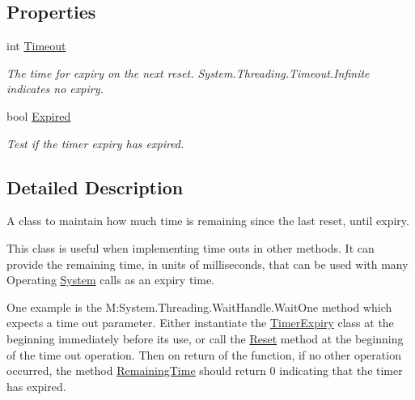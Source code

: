 \subsection*{Properties}
\begin{DoxyCompactItemize}
\item 
int \mbox{\hyperlink{class_r_j_c_p_1_1_datastructures_1_1_timer_expiry_ad6a62756590878b3053a15a5c112d944}{Timeout}}
\begin{DoxyCompactList}\small\item\em The time for expiry on the next reset. System.\+Threading.\+Timeout.\+Infinite indicates no expiry. \end{DoxyCompactList}\item 
bool \mbox{\hyperlink{class_r_j_c_p_1_1_datastructures_1_1_timer_expiry_ab764bd1af3d3270ee128f649949bdb19}{Expired}}
\begin{DoxyCompactList}\small\item\em Test if the timer expiry has expired. \end{DoxyCompactList}\end{DoxyCompactItemize}


\subsection{Detailed Description}
A class to maintain how much time is remaining since the last reset, until expiry. 

This class is useful when implementing time outs in other methods. It can provide the remaining time, in units of milliseconds, that can be used with many Operating \mbox{\hyperlink{namespace_system}{System}} calls as an expiry time. 

One example is the M\+:\+System.\+Threading.\+Wait\+Handle.\+Wait\+One method which expects a time out parameter. Either instantiate the \mbox{\hyperlink{class_r_j_c_p_1_1_datastructures_1_1_timer_expiry}{Timer\+Expiry}} class at the beginning immediately before its use, or call the \mbox{\hyperlink{class_r_j_c_p_1_1_datastructures_1_1_timer_expiry_ad2241fbbdbbe1423b50f4b4b54ccbed1}{Reset}} method at the beginning of the time out operation. Then on return of the function, if no other operation occurred, the method \mbox{\hyperlink{class_r_j_c_p_1_1_datastructures_1_1_timer_expiry_aae9e5e2c9c3f6d30001e4fb04abf2244}{Remaining\+Time}} should return 0 indicating that the timer has expired.

